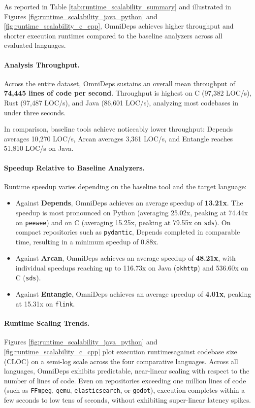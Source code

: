 As reported in Table \ref{tab:runtime_scalability_summary} and
illustrated in Figures \ref{fig:runtime_scalability_java_python} and
\ref{fig:runtime_scalability_c_cpp}, OmniDeps achieves higher
throughput and shorter execution runtimes compared to the baseline
analyzers across all evaluated languages.

\paragraph{Analysis Throughput.}
Across the entire dataset, OmniDeps sustains an overall mean
throughput of \textbf{74,445 lines of code per second}. Throughput is
highest on C (97,382 LOC/s), Rust (97,487 LOC/s),
and Java (86,601 LOC/s), analyzing most codebases in under three
seconds.

In comparison, baseline tools achieve noticeably lower throughput:
Depends averages 10,270 LOC/s, Arcan averages 3,361 LOC/s, and
Entangle reaches 51,810 LOC/s on Java.

\paragraph{Speedup Relative to Baseline Analyzers.}
Runtime speedup varies depending on the baseline tool and the target language:
\begin{itemize}
  \item Against \textbf{Depends}, OmniDeps achieves an average speedup
    of \textbf{13.21x}. The speedup is most pronounced on Python (averaging
    25.02x, peaking at 74.44x on \texttt{peewee}) and on C (averaging
    15.25x, peaking at 79.55x on \texttt{sds}). On compact repositories
    such as \texttt{pydantic}, Depends completed in comparable time,
    resulting in a minimum speedup of 0.88x.
  \item Against \textbf{Arcan}, OmniDeps achieves an average speedup
    of \textbf{48.21x}, with individual speedups reaching up to 116.73x on
    Java (\texttt{okhttp}) and 536.60x on C (\texttt{sds}).
  \item Against \textbf{Entangle}, OmniDeps achieves an average speedup
    of \textbf{4.01x}, peaking at 15.31x on \texttt{flink}.
\end{itemize}

\paragraph{Runtime Scaling Trends.}
Figures \ref{fig:runtime_scalability_java_python} and
\ref{fig:runtime_scalability_c_cpp} plot execution runtimes\linebreak against
codebase size (CLOC) on a semi-log scale across the four comparative
languages. Across all languages, OmniDeps exhibits predictable,
near-linear scaling with respect to the number of lines of code. Even on
repositories exceeding one million lines of code (such as \texttt{FFmpeg},
\texttt{qemu}, \texttt{elasticsearch}, or \texttt{godot}), execution
completes within a few seconds to low tens of seconds, without
exhibiting super-linear latency spikes.

